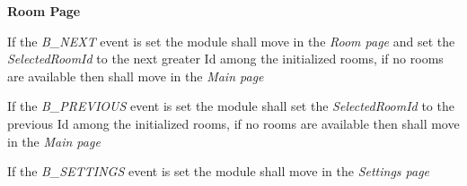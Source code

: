 \begin{req_enum}
\begin{req_enum}[label*=\arabic*.]
					\item \textbf{Room Page}
						\begin{req_enum}[label*=\arabic*.]
							\item If the \textit{B\_NEXT} event is set the module shall move in the \textit{Room page} and set the \textit{SelectedRoomId} to the next greater Id among the initialized rooms, if no rooms are available then shall move in the \textit{Main page} \\
							\item If the \textit{B\_PREVIOUS} event is set the module shall set the \textit{SelectedRoomId} to the previous Id among the initialized rooms, if no rooms are available then shall move in the \textit{Main page} \\
							\item If the \textit{B\_SETTINGS} event is set the module shall move in the \textit{Settings page}


\end{req_enum}
\end{req_enum}
\end{req_enum}

